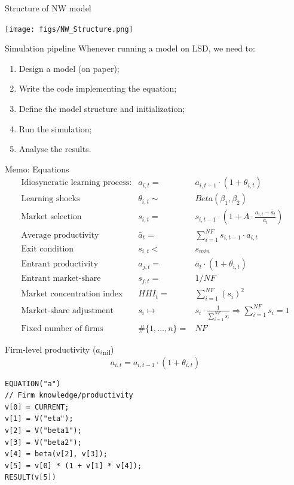 \documentclass[bigger,aspectratio=169]{beamer}
\begin{document}
\begin{frame}[label={sec:org61ea3c7}]{Structure of NW model}
\begin{center}
\texttt{[image: figs/NW\_Structure.png]}
\end{center}
\end{frame}
\begin{frame}[label={sec:orgc44611a}]{Simulation pipeline}
Whenever running a model on LSD, we need to:

\begin{enumerate}
\item Design a model (on paper);
\item Write the code implementing the equation;
\item Define the model structure and initialization;
\item Run the simulation;
\item Analyse the results.
\end{enumerate}
\end{frame}
\begin{frame}[label={sec:org5ee693b}]{Memo: Equations}
\[ \begin{array}{lrl}
\mbox{Idiosyncratic learning process:} & a_{i,t} = &a_{i,t-1}\cdot (1 + \theta_{i,t})\\
\mbox{Learning shocks} & \theta_{i,t} \sim  & Beta(\beta_1, \beta_2)\\
\mbox{Market selection} & s_{i,t} =  & s_{i,t-1} \cdot \left( 1 + A\cdot\frac{a_{i,t} - \bar{a}_{t}}{\bar{a}_{t}}\right) \\
\mbox{Average productivity} & \bar{a}_{t} =  & \sum_{i=1}^{NF} s_{i, t-1}\cdot a_{i,t} \\
\mbox{Exit condition} & s_{i,t} < & s_{min}\\
\mbox{Entrant productivity} & a_{j,t} =&  \bar{a}_{t}\cdot (1 + \theta_{i,t})\\
\mbox{Entrant market-share} & s_{j,t} =& 1/NF \\
\mbox{Market concentration index} & HHI_{t} =& \sum_{i=1}^{NF} (s_{i})^2 \\
\mbox{Market-share adjustment} &  s_{i} \mapsto & s_{i}\cdot \frac{1}{\sum_{i=1}^{NF} s_{i}} \Rightarrow \sum_{i=1}^{NF} s_{i} = 1 \\
\mbox{Fixed number of firms} & \#\{1, \ldots, n\} =& NF
\end{array}\]
\end{frame}
\begin{frame}[label={sec:org8eda071},fragile]{Firm-level productivity (\(a_{i}\)\textsubscript{nil})}
 \begin{equation}
a_{i,t} = a_{i,t-1}\cdot (1 + \theta_{i,t})
\end{equation}

\begin{verbatim}
EQUATION("a")
// Firm knowledge/productivity
v[0] = CURRENT;
v[1] = V("eta");
v[2] = V("beta1");
v[3] = V("beta2");
v[4] = beta(v[2], v[3]);
v[5] = v[0] * (1 + v[1] * v[4]);
RESULT(v[5])
\end{verbatim}
\end{frame}
\end{document}
